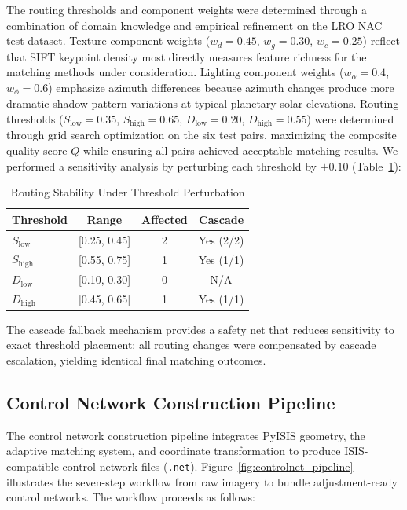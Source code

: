 \documentclass[lettersize,journal]{IEEEtran}
\newcommand{\pyisis}{PyISIS}
\begin{document}
The routing thresholds and component weights were determined through a combination of domain knowledge and empirical refinement on the LRO NAC test dataset. Texture component weights ($w_d = 0.45$, $w_g = 0.30$, $w_c = 0.25$) reflect that SIFT keypoint density most directly measures feature richness for the matching methods under consideration. Lighting component weights ($w_\alpha = 0.4$, $w_\phi = 0.6$) emphasize azimuth differences because azimuth changes produce more dramatic shadow pattern variations at typical planetary solar elevations. Routing thresholds ($S_{\text{low}} = 0.35$, $S_{\text{high}} = 0.65$, $D_{\text{low}} = 0.20$, $D_{\text{high}} = 0.55$) were determined through grid search optimization on the six test pairs, maximizing the composite quality score $Q$ while ensuring all pairs achieved acceptable matching results. We performed a sensitivity analysis by perturbing each threshold by $\pm 0.10$ (Table~\ref{tab:sensitivity}):

\begin{table}[htbp]
\caption{Routing Stability Under Threshold Perturbation}
\label{tab:sensitivity}
\centering
\begin{tabular}{@{}lccc@{}}
\toprule
\textbf{Threshold} & \textbf{Range} & \textbf{Affected} & \textbf{Cascade} \\
\midrule
$S_{\text{low}}$ & [0.25, 0.45] & 2 & Yes (2/2) \\
$S_{\text{high}}$ & [0.55, 0.75] & 1 & Yes (1/1) \\
$D_{\text{low}}$ & [0.10, 0.30] & 0 & N/A \\
$D_{\text{high}}$ & [0.45, 0.65] & 1 & Yes (1/1) \\
\bottomrule
\end{tabular}
\end{table}

The cascade fallback mechanism provides a safety net that reduces sensitivity to exact threshold placement: all routing changes were compensated by cascade escalation, yielding identical final matching outcomes.

\subsection{Control Network Construction Pipeline}

The control network construction pipeline integrates \pyisis{} geometry, the adaptive matching system, and coordinate transformation to produce ISIS-compatible control network files (\texttt{.net}). Figure~\ref{fig:controlnet_pipeline} illustrates the seven-step workflow from raw imagery to bundle adjustment-ready control networks. The workflow proceeds as follows:
\end{document}
